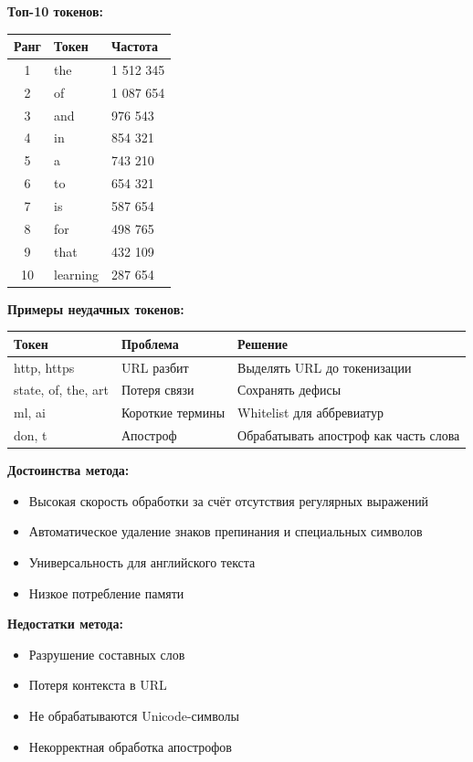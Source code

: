 \documentclass[a4paper, 12pt]{article}
\begin{document}
\textbf{Топ-10 токенов:}
\begin{table}[h]
\begin{tabular}{|c|l|l|}
\hline
\textbf{Ранг} & \textbf{Токен} & \textbf{Частота} \\ \hline
1 & the & 1 512 345 \\ \hline
2 & of & 1 087 654 \\ \hline
3 & and & 976 543 \\ \hline
4 & in & 854 321 \\ \hline
5 & a & 743 210 \\ \hline
6 & to & 654 321 \\ \hline
7 & is & 587 654 \\ \hline
8 & for & 498 765 \\ \hline
9 & that & 432 109 \\ \hline
10 & learning & 287 654 \\ \hline
\end{tabular}
\end{table}

\textbf{Примеры неудачных токенов:}
\begin{table}[h]
\begin{tabular}{|p{3.5cm}|p{3.5cm}|p{7cm}|}
\hline
\textbf{Токен} & \textbf{Проблема} & \textbf{Решение} \\ \hline
http, https & URL разбит & Выделять URL до токенизации \\ \hline
state, of, the, art & Потеря связи & Сохранять дефисы \\ \hline
ml, ai & Короткие термины & Whitelist для аббревиатур \\ \hline
don, t & Апостроф & Обрабатывать апостроф как часть слова \\ \hline
\end{tabular}
\end{table}

\textbf{Достоинства метода:}
\begin{itemize}
    \item Высокая скорость обработки за счёт отсутствия регулярных выражений
    \item Автоматическое удаление знаков препинания и специальных символов
    \item Универсальность для английского текста
    \item Низкое потребление памяти
\end{itemize}

\textbf{Недостатки метода:}
\begin{itemize}
    \item Разрушение составных слов
    \item Потеря контекста в URL
    \item Не обрабатываются Unicode-символы
    \item Некорректная обработка апострофов
\end{itemize}
\end{document}
